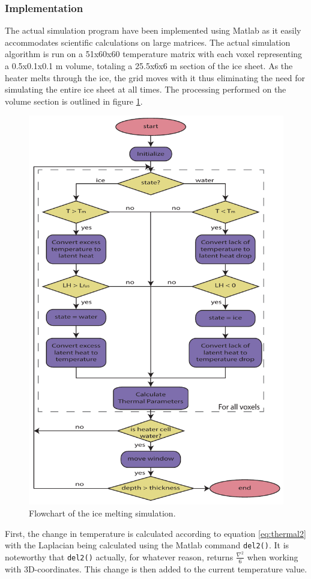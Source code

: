 \subsubsection{Implementation}
The actual simulation program have been implemented using Matlab as it easily accommodates scientific calculations on large matrices. The actual simulation algorithm is run on a 51x60x60 temperature matrix with each voxel representing a 0.5x0.1x0.1 m volume, totaling a 25.5x6x6 m section of the ice sheet. As the heater melts through the ice, the grid moves with it thus eliminating the need for simulating the entire ice sheet at all times. The processing performed on the volume section is outlined in figure \ref{fig:iceSimFlow}.\\

 \begin{figure}[ht]
 	\centering
 	\includegraphics[width=.55\textwidth]{figures/LAMC/iceSimFlowchart.pdf}
 	\caption{Flowchart of the ice melting simulation.}
 	\label{fig:iceSimFlow}
 \end{figure}
 
\noindent
First, the change in temperature is calculated according to equation \ref{eq:thermal2} with the Laplacian being calculated using the Matlab command \texttt{del2()}. It is noteworthy that \texttt{del2()} actually, for whatever reason, returns $\frac{\nabla^2}{6}$ when working with 3D-coordinates. This change is then added to the current temperature value.\\

